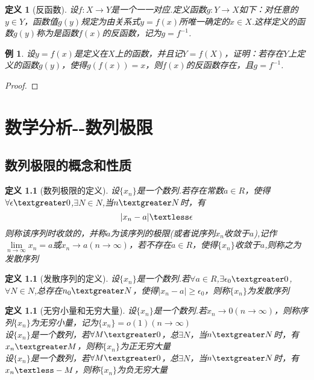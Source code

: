 \documentclass[12pt, a4paper, oneside]{ctexart}
\newtheorem{definition}[theorem]{定义}
\newtheorem{example}[theorem]{例}
\begin{document}
\begin{definition}[反函数]
设$f:X\to Y$是一个一一对应.定义函数$g:Y\to X$如下：对任意的$y\in Y$，函数值$g(y)$规定为由关系式$y=f(x)$所唯一确定的$x\in X$.这样定义的函数$g(y)$称为是函数$f(x)$的反函数，记为$g=f^{-1}$.
\end{definition}

\begin{example}
设$y=f(x)$是定义在$X$上的函数，并且记$Y=f(X)$，证明：若存在$Y$上定义的函数$g(y)$，使得$g(f(x))=x$，则$f(x)$的反函数存在，且$g=f^{-1}$.
\end{example}

\begin{proof}

\end{proof}






\chapter{数学分析-\uppercase\expandafter{}-数列极限}

\section{数列极限的概念和性质}
\begin{definition}[数列极限的定义]
设$\{x_n\}$是一个数列.若存在常数$a \in R$，使得$\forall \epsilon \textgreater 0$,$\exists N \in N $,当$n \textgreater N$时，有
\begin{equation*}
    |x_n-a|\textless \epsilon
\end{equation*}
则称该序列时收敛的，并称$a$为该序列的极限(或者说序列${x_n}$收敛于$a$),记作$\lim\limits_{n\to \infty}x_n=a$或$x_n \to a(n \to \infty)$，若不存在$a \in R$，使得$\{x_n\}$收敛于$a$,则称之为发散序列

\end{definition}


\begin{definition}[发散序列的定义]
设$\{x_n\}$是一个数列.若$\forall a \in R$,$\exists \epsilon_0 \textgreater 0$,$\forall N\in N$,总存在$n_0 \textgreater N$，使得$|x_n-a|\geq \epsilon_0$，则称$\{x_n\}$为发散序列
\end{definition}

\begin{definition}[无穷小量和无穷大量]
设$\{x_n\}$是一个数列.若$x_n \to 0(n \to \infty )$，则称序列$\{x_n\}$为无穷小量，记为$\{x_n\}=o(1)(n \to \infty)$\\
设$\{x_n\}$是一个数列，若$\forall M \textgreater 0$，总$\exists N$，当$n \textgreater N$时，有$x_n \textgreater M $，则称$\{x_n\}$为正无穷大量\\
设$\{x_n\}$是一个数列，若$\forall M \textgreater 0$，总$\exists N$，当$n \textgreater N$时，有$x_n \textless -M $，则称$\{x_n\}$为负无穷大量
\end{definition}
\end{document}
